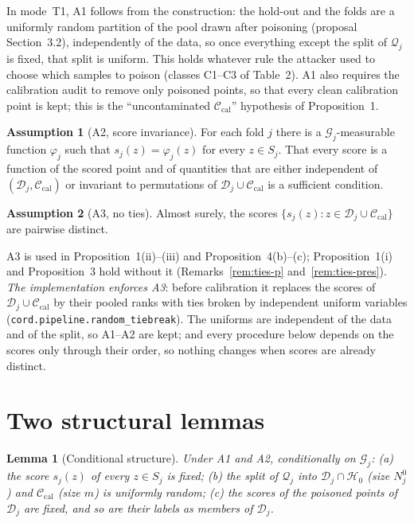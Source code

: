 \documentclass[11pt]{article}
\newtheorem{lemma}{Lemma}
\theoremstyle{definition}
\newtheorem{assumption}{Assumption}
\theoremstyle{remark}
\newcommand{\Cal}{\mathcal{C}_{\mathrm{cal}}}
\newcommand{\D}{\mathcal{D}}
\newcommand{\G}{\mathcal{G}}
\newcommand{\Q}{\mathcal{Q}}
\newcommand{\Hnull}{\mathcal{H}_0}
\newcommand{\1}{\mathbf{1}}
\begin{document}
In mode~T1, A1 follows from the construction: the hold-out and the folds are a uniformly random
partition of the pool drawn after poisoning (proposal Section~3.2), independently of the data, so
once everything except the split of $\Q_j$ is fixed, that split is uniform. This holds whatever
rule the attacker used to choose which samples to poison (classes C1--C3 of Table~2). A1 also
requires the calibration audit to remove only poisoned points, so that every clean calibration
point is kept; this is the ``uncontaminated $\Cal$'' hypothesis of Proposition~1.

\begin{assumption}[A2, score invariance]\label{as:A2}
For each fold $j$ there is a $\G_j$-measurable function $\varphi_j$ such that
$s_j(z)=\varphi_j(z)$ for every $z\in S_j$. That every score is a function of the scored
point and of quantities that are either independent of $(\D_j,\Cal)$ or invariant to permutations
of $\D_j\cup\Cal$ is a sufficient condition.
\end{assumption}

\begin{assumption}[A3, no ties]\label{as:A3}
Almost surely, the scores $\{s_j(z):z\in\D_j\cup\Cal\}$ are pairwise distinct.
\end{assumption}

A3 is used in Proposition~1(ii)--(iii) and Proposition~4(b)--(c); Proposition~1(i) and
Proposition~3 hold without it (Remarks~\ref{rem:ties-p} and~\ref{rem:ties-pres}). \emph{The
implementation enforces A3}: before calibration it replaces the scores of $\D_j\cup\Cal$ by their
pooled ranks with ties broken by independent uniform variables (\texttt{cord.pipeline.random\_tiebreak}).
The uniforms are independent of the data and of the split, so A1--A2 are kept; and every procedure
below depends on the scores only through their order, so nothing changes when scores are already
distinct.

\section{Two structural lemmas}

\begin{lemma}[Conditional structure]\label{lem:structure}
Under A1 and A2, conditionally on $\G_j$: (a) the score $s_j(z)$ of every $z\in S_j$ is fixed;
(b) the split of $\Q_j$ into $\D_j\cap\Hnull$ (size $N_j^0$) and $\Cal$ (size $m$) is uniformly
random; (c) the scores of the poisoned points of $\D_j$ are fixed, and so are their labels as
members of $\D_j$.
\end{lemma}
\end{document}

